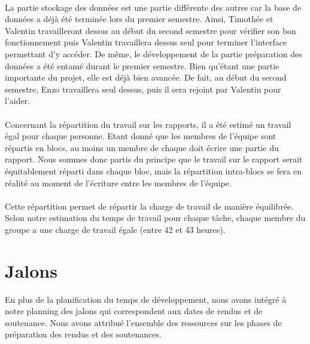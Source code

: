 \paragraph{}

La partie stockage des données est une partie différente des autres car la base de données a déjà été terminée lors du premier semestre. Ainsi, Timothée et Valentin travailleront dessus au début du second semestre pour vérifier son bon fonctionnement puis Valentin travaillera dessus seul pour terminer l’interface permettant d’y accéder. De même, le développement de la partie préparation des données a été entamé durant le premier semestre. Bien qu’étant une partie importante du projet, elle est déjà bien avancée. De fait, au début du second semestre, Enzo travaillera seul dessus, puis il sera rejoint par Valentin pour l’aider.

\paragraph{}

Concernant la répartition du travail sur les rapports, il a été estimé un travail égal pour chaque personne. Etant donné que les membres de l’équipe sont répartis en blocs, au moins un membre de chaque doit écrire une partie du rapport. Nous sommes donc partis du principe que le travail sur le rapport serait équitablement réparti dans chaque bloc, mais la répartition intra-blocs se fera en réalité au moment de l’écriture entre les membres de l’équipe.

\paragraph{}

Cette répartition permet de répartir la charge de travail de manière équilibrée. Selon notre estimation du temps de travail pour chaque tâche, chaque membre du groupe a une charge de travail égale (entre 42 et 43 heures).

\section{Jalons}

En plus de la planification du temps de développement, nous avons intégré à notre planning des jalons qui correspondent aux dates de rendus et de soutenance. Nous avons attribué l’ensemble des ressources sur les phases de préparation des rendus et des soutenances.

